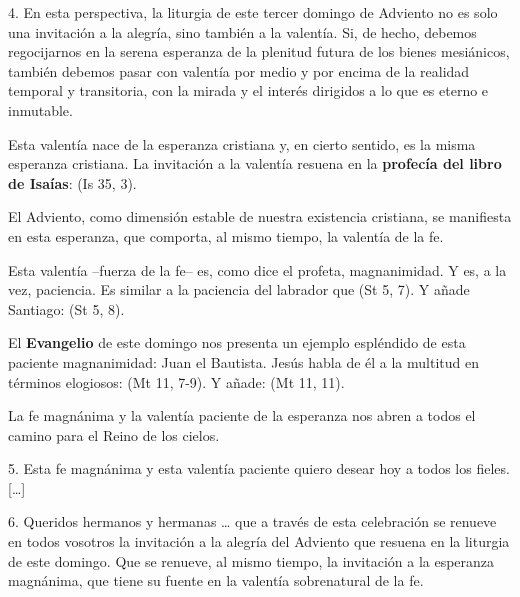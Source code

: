 \begin{body}
\begin{body}
4. En esta perspectiva, la liturgia de este tercer domingo de Adviento no es solo una invitación a la alegría, sino también a la valentía. Si, de hecho, debemos regocijarnos en la serena esperanza de la plenitud futura de los bienes mesiánicos, también debemos pasar con valentía por medio y por encima de la realidad temporal y transitoria, con la mirada y el interés dirigidos a lo que es eterno e inmutable.

Esta valentía nace de la esperanza cristiana y, en cierto sentido, es la misma esperanza cristiana. La invitación a la valentía resuena en la \textbf{profecía del libro de Isaías}:  (Is 35, 3).

El Adviento, como dimensión estable de nuestra existencia cristiana, se manifiesta en esta esperanza, que comporta, al mismo tiempo, la valentía  de la fe.

Esta valentía --fuerza de la fe-- es, como dice el profeta, magnanimidad. Y es, a la vez, paciencia. Es similar a la paciencia del labrador que  (St 5, 7). Y añade Santiago:  (St 5, 8).

El \textbf{Evangelio} de este domingo nos presenta un ejemplo espléndido de esta paciente magnanimidad: Juan el Bautista. Jesús habla de él a la multitud en términos elogiosos:  (Mt 11, 7-9). Y añade:  (Mt 11, 11).

La fe magnánima y la valentía paciente de la esperanza nos abren a todos el camino para el Reino de los cielos.

5. Esta fe magnánima y esta valentía paciente quiero desear hoy a todos los fieles. {[}\ldots{}{]}

6. Queridos hermanos y hermanas \ldots{} que a través de esta celebración se renueve en todos vosotros la invitación a la alegría del Adviento que resuena en la liturgia de este domingo. Que se renueve, al mismo tiempo, la invitación a la esperanza magnánima, que tiene su fuente en la valentía sobrenatural de la fe.


\end{body}
\end{body}
